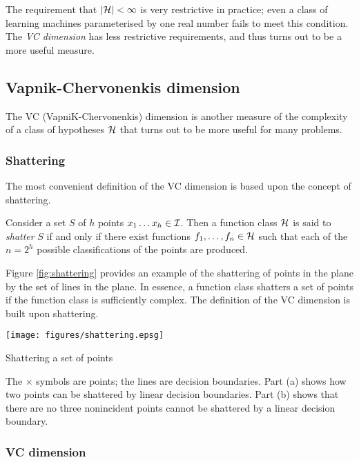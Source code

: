 The requirement that $|\mathcal{H}| < \infty$ is very restrictive in
practice; even a class of learning machines parameterised by one real
number fails to meet this condition.  The \emph{VC dimension} has less
restrictive requirements, and thus turns out to be a more useful measure.


\subsection{Vapnik-Chervonenkis dimension}
\label{acr:vcdim}

The VC (VapniK-Chervonenkis) dimension is another measure of the complexity
of a class of hypotheses $\mathcal{H}$ that turns out to be more useful for
many problems.

\subsubsection{Shattering}

The most convenient definition of the VC dimension is based upon the
concept of shattering.

\begin{definition}[Shattering]
Consider a set $S$ of $h$ points $x_1 \ldots x_h \in \mathcal{I}$.  Then a
function class $\mathcal{H}$ is said to \emph{shatter} $S$ if and only if
there exist functions $f_1, \ldots, f_n \in \mathcal{H}$ such that each of
the $n = 2^h$ possible classifications of the points are produced.
\end{definition}

Figure \ref{fig:shattering} provides an example of the shattering of
points in the plane by the set of lines in the plane.  In essence, a
function class shatters a set of points if the function class is
sufficiently complex.  The definition of the VC dimension is built
upon shattering.

\begin{linefigure}
\begin{center}
\texttt{[image: figures/shattering.epsg]}
\end{center}
\caption{Shattering a set of points}
\label{fig:shattering}
The $\times$ symbols are points; the lines are decision boundaries.
Part (a) shows how two points can be shattered by linear decision
boundaries.  Part (b) shows that there are no three nonincident points
cannot be shattered by a linear decision boundary.
\end{linefigure}


\subsubsection{VC dimension}

